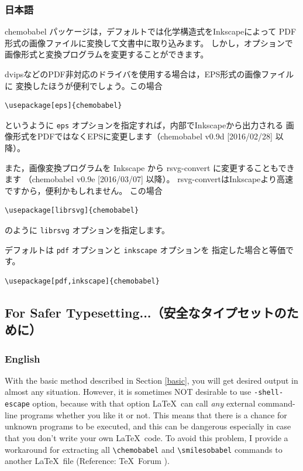 \documentclass[12pt]{ltjsarticle}
\begin{document}
\clearpage

\subsubsection{日本語}

\textsf{chemobabel} パッケージは，デフォルトでは化学構造式をInkscapeによって
PDF形式の画像ファイルに変換して文書中に取り込みます。
しかし，オプションで画像形式と変換プログラムを変更することができます。

dvipsなどのPDF非対応のドライバを使用する場合は，EPS形式の画像ファイルに
変換したほうが便利でしょう。この場合
\begin{verbatim}
\usepackage[eps]{chemobabel}
\end{verbatim}
というように \verb|eps| オプションを指定すれば，内部でInkscapeから出力される
画像形式をPDFではなくEPSに変更します（\textsf{chemobabel} v0.9d [2016/02/28] 以降）。

また，画像変換プログラムを Inkscape から rsvg-convert に変更することもできます
（\textsf{chemobabel} v0.9e [2016/03/07] 以降）。
rsvg-convertはInkscapeより高速ですから，便利かもしれません。
この場合
\begin{verbatim}
\usepackage[librsvg]{chemobabel}
\end{verbatim}
のように \verb|librsvg| オプションを指定します。

デフォルトは \verb|pdf| オプションと \verb|inkscape| オプションを
指定した場合と等価です。
\begin{verbatim}
\usepackage[pdf,inkscape]{chemobabel}
\end{verbatim}

\clearpage

\subsection{For Safer Typesetting...（安全なタイプセットのために）} \label{extract}

\subsubsection{English}

With the basic method described in Section \ref{basic},
you will get desired output in almost any situation.
However, it is sometimes NOT desirable to use \verb|-shell-escape| option,
because with that option \LaTeX\ can call \emph{any} external command-line
programs whether you like it or not.
This means that there is a chance for unknown programs to be executed,
and this can be dangerous especially in case that you don't write your
own \LaTeX\ code. To avoid this problem, I provide a workaround for
extracting all \verb|\chemobabel| and \verb|\smilesobabel| commands
to another \LaTeX\ file (Reference: \TeX\ Forum \cite{OKU}).
\end{document}
